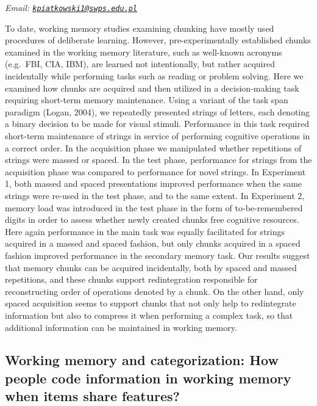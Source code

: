 \documentclass[12pt,]{book}
\begin{document}
\emph{Email: \href{mailto:kpiatkowski1@swps.edu.pl}{\nolinkurl{kpiatkowski1@swps.edu.pl}}}

To date, working memory studies examining chunking have mostly used procedures of deliberate learning. However, pre-experimentally established chunks examined in the working memory literature, such as well-known acronyms (e.g.~FBI, CIA, IBM), are learned not intentionally, but rather acquired incidentally while performing tasks such as reading or problem solving. Here we examined how chunks are acquired and then utilized in a decision-making task requiring short-term memory maintenance. Using a variant of the task span paradigm (Logan, 2004), we repeatedly presented strings of letters, each denoting a binary decision to be made for visual stimuli. Performance in this task required short-term maintenance of strings in service of performing cognitive operations in a correct order. In the acquisition phase we manipulated whether repetitions of strings were massed or spaced. In the test phase, performance for strings from the acquisition phase was compared to performance for novel strings. In Experiment 1, both massed and spaced presentations improved performance when the same strings were re-used in the test phase, and to the same extent. In Experiment 2, memory load was introduced in the test phase in the form of to-be-remembered digits in order to assess whether newly created chunks free cognitive resources. Here again performance in the main task was equally facilitated for strings acquired in a massed and spaced fashion, but only chunks acquired in a spaced fashion improved performance in the secondary memory task.
Our results suggest that memory chunks can be acquired incidentally, both by spaced and massed repetitions, and these chunks support redintegration responsible for reconstructing order of operations denoted by a chunk. On the other hand, only spaced acquisition seems to support chunks that not only help to redintegrate information but also to compress it when performing a complex task, so that additional information can be maintained in working memory.

\hypertarget{working-memory-and-categorization-how-people-code-information-in-working-memory-when-items-share-features}{%
\subsection{Working memory and categorization: How people code information in working memory when items share features?}\label{working-memory-and-categorization-how-people-code-information-in-working-memory-when-items-share-features}}
\end{document}
